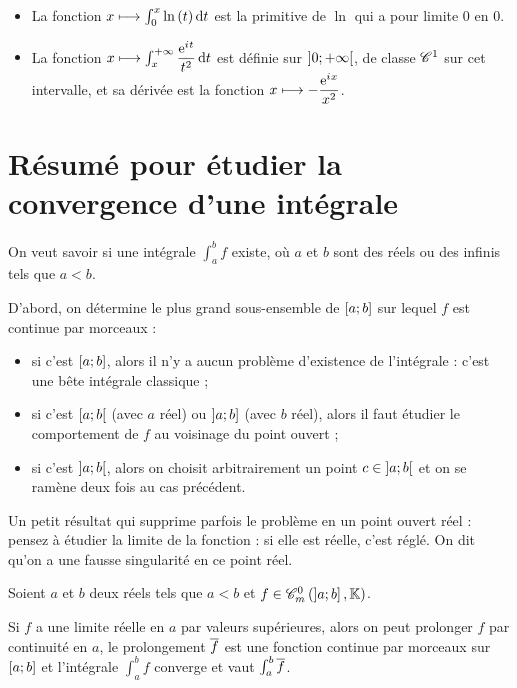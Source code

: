 \begin{ex}
\begin{itemize}
    \item La fonction \(x\mapsto\int_0^x\ln\paren{t}\odif{t}\) est la primitive de \(\ln\) qui a pour limite \(0\) en \(0\). \\
    \item La fonction \(x\mapsto\int_x^{\pinf}\dfrac{\e{\i t}}{t^2}\odif{t}\) est définie sur \(\left]0;+\infty\right[\), de classe \(\mathscr{C}^{1}\) sur cet intervalle, et sa dérivée est la fonction \(x\longmapsto-\dfrac{\mathrm{e}^{i\mkern1mu x}}{x^2}\).
\end{itemize}
\end{ex}

\section{Résumé pour étudier la convergence d'une intégrale}

On veut savoir si une intégrale \(\int_a^bf\) existe, où \(a\) et \(b\) sont des réels ou des infinis tels que \(a<b\).

D'abord, on détermine le plus grand sous-ensemble de \(\left[a;b\right]\) sur lequel \(f\) est continue par morceaux :

\begin{itemize}
    \item si c'est \(\left[a;b\right]\), alors il n'y a aucun problème d'existence de l'intégrale : c'est une bête intégrale classique ; \\
    \item si c'est \(\left[a;b\right[\) (avec \(a\) réel) ou \(\left]a;b\right]\) (avec \(b\) réel), alors il faut étudier le comportement de \(f\) au voisinage du point ouvert ; \\
    \item si c'est \(\left]a;b\right[\), alors on choisit arbitrairement un point \(c\in\left]a;b\right[\) et on se ramène deux fois au cas précédent.
\end{itemize}

Un petit résultat qui supprime parfois le problème en un point ouvert réel : pensez à étudier la limite de la fonction : si elle est réelle, c'est réglé. On dit qu'on a une fausse singularité en ce point réel.

\begin{prop}
Soient \(a\) et \(b\) deux réels tels que \(a<b\) et \(f\in\contm[\intervei{a}{b}]\).

Si \(f\) a une limite réelle en \(a\) par valeurs supérieures, alors on peut prolonger \(f\) par continuité en \(a\), le prolongement \(\overline{f}\) est une fonction continue par morceaux sur \(\left[a;b\right]\) et l'intégrale \(\int_a^bf\) converge et vaut \(\int_a^b\overline{f}\).
\end{prop}

